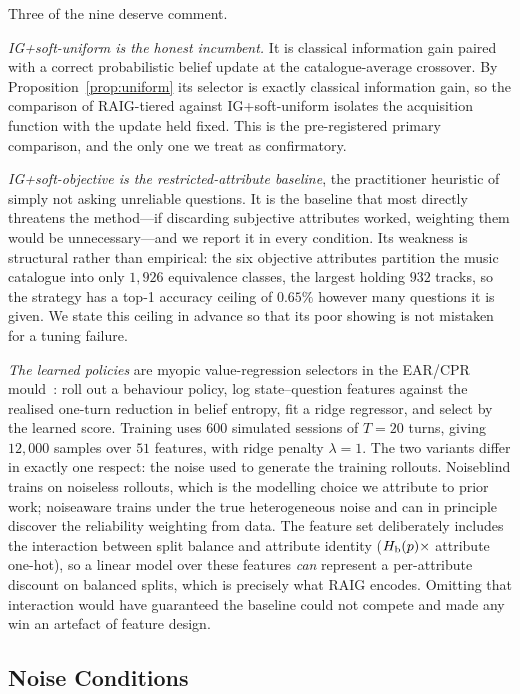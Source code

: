 Three of the nine deserve comment.

\emph{IG+soft-uniform is the honest incumbent.} It is classical information
gain paired with a correct probabilistic belief update at the catalogue-average
crossover. By Proposition~\ref{prop:uniform} its selector is exactly classical
information gain, so the comparison of RAIG-tiered against IG+soft-uniform
isolates the acquisition function with the update held fixed. This is the
pre-registered primary comparison, and the only one we treat as confirmatory.

\emph{IG+soft-objective is the restricted-attribute baseline}, the practitioner
heuristic of simply not asking unreliable questions. It is the baseline that
most directly threatens the method---if discarding subjective attributes
worked, weighting them would be unnecessary---and we report it in every
condition. Its weakness is structural rather than empirical: the six objective
attributes partition the music catalogue into only $1{,}926$ equivalence
classes, the largest holding $932$ tracks, so the strategy has a top-1 accuracy
ceiling of $0.65\%$ however many questions it is given. We state this ceiling
in advance so that its poor showing is not mistaken for a tuning failure.

\emph{The learned policies} are myopic value-regression selectors in the
EAR/CPR mould~\cite{lei2020ear,lei2020cpr}: roll out a behaviour policy, log
state--question features against the realised one-turn reduction in belief
entropy, fit a ridge regressor, and select by the learned score. Training uses
$600$ simulated sessions of $T=20$ turns, giving $12{,}000$ samples over $51$
features, with ridge penalty $\lambda=1$. The two variants differ in exactly
one respect: the noise used to generate the training rollouts. Noiseblind
trains on noiseless rollouts, which is the modelling choice we attribute to
prior work; noiseaware trains under the true heterogeneous noise and can in
principle discover the reliability weighting from data. The feature set
deliberately includes the interaction between split balance and attribute
identity ($H_{\mathrm{b}}(p) \times$ attribute one-hot), so a linear model over these
features \emph{can} represent a per-attribute discount on balanced splits,
which is precisely what RAIG encodes. Omitting that interaction would have
guaranteed the baseline could not compete and made any win an artefact of
feature design.

\subsection{Noise Conditions}
\label{sec:conditions}

